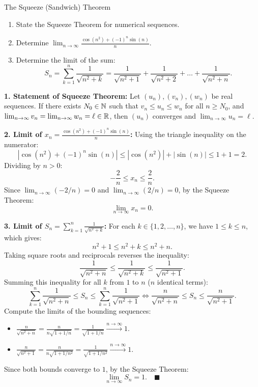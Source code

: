 \begin{exercise}{The Squeeze (Sandwich) Theorem}
\begin{enumerate}[leftmargin=1.5em,itemsep=2pt]
  \item State the Squeeze Theorem for numerical sequences.
  \item Determine $\lim_{n \to \infty} \frac{\cos(n^2) + (-1)^n \sin(n)}{n}$.
  \item Determine the limit of the sum:
  \[
  S_n = \sum_{k=1}^n \frac{1}{\sqrt{n^2 + k}} = \frac{1}{\sqrt{n^2 + 1}} + \frac{1}{\sqrt{n^2 + 2}} + \dots + \frac{1}{\sqrt{n^2 + n}}.
  \]
\end{enumerate}
\end{exercise}

\begin{tabletworkspace}[5.0cm]
\end{tabletworkspace}

\begin{solution}
\textbf{1. Statement of Squeeze Theorem:}
Let $(u_n), (v_n), (w_n)$ be real sequences. If there exists $N_0 \in \mathbb{N}$ such that $v_n \le u_n \le w_n$ for all $n \ge N_0$, and $\lim_{n \to \infty} v_n = \lim_{n \to \infty} w_n = \ell \in \mathbb{R}$, then $(u_n)$ converges and $\lim_{n \to \infty} u_n = \ell$.

\textbf{2. Limit of $x_n = \frac{\cos(n^2) + (-1)^n \sin(n)}{n}$:}
Using the triangle inequality on the numerator:
\[
|\cos(n^2) + (-1)^n \sin(n)| \le |\cos(n^2)| + |\sin(n)| \le 1 + 1 = 2.
\]
Dividing by $n > 0$:
\[
-\frac{2}{n} \le x_n \le \frac{2}{n}.
\]
Since $\lim_{n \to \infty} (-2/n) = 0$ and $\lim_{n \to \infty} (2/n) = 0$, by the Squeeze Theorem:
\[
\lim_{n \to \infty} x_n = 0.
\]

\textbf{3. Limit of $S_n = \sum_{k=1}^n \frac{1}{\sqrt{n^2 + k}}$:}
For each $k \in \{1, 2, \dots, n\}$, we have $1 \le k \le n$, which gives:
\[
n^2 + 1 \le n^2 + k \le n^2 + n.
\]
Taking square roots and reciprocals reverses the inequality:
\[
\frac{1}{\sqrt{n^2 + n}} \le \frac{1}{\sqrt{n^2 + k}} \le \frac{1}{\sqrt{n^2 + 1}}.
\]
Summing this inequality for all $k$ from $1$ to $n$ ($n$ identical terms):
\[
\sum_{k=1}^n \frac{1}{\sqrt{n^2 + n}} \le S_n \le \sum_{k=1}^n \frac{1}{\sqrt{n^2 + 1}} \iff \frac{n}{\sqrt{n^2 + n}} \le S_n \le \frac{n}{\sqrt{n^2 + 1}}.
\]
Compute the limits of the bounding sequences:
\begin{itemize}[leftmargin=1.5em,itemsep=1pt]
  \item $\frac{n}{\sqrt{n^2 + n}} = \frac{n}{n\sqrt{1 + 1/n}} = \frac{1}{\sqrt{1 + 1/n}} \xrightarrow{n \to \infty} 1$.
  \item $\frac{n}{\sqrt{n^2 + 1}} = \frac{n}{n\sqrt{1 + 1/n^2}} = \frac{1}{\sqrt{1 + 1/n^2}} \xrightarrow{n \to \infty} 1$.
\end{itemize}
Since both bounds converge to $1$, by the Squeeze Theorem:
\[
\lim_{n \to \infty} S_n = 1. \quad \blacksquare
\]
\end{solution}

